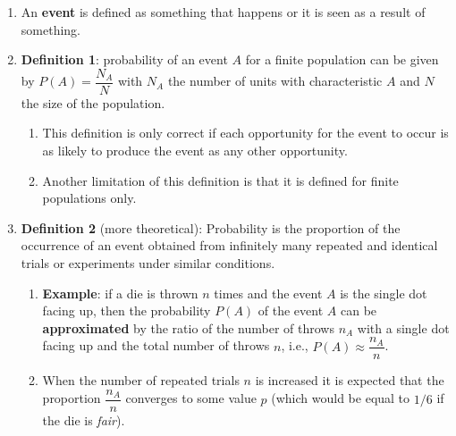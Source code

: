 \begin{enumerate}
    \item An \textbf{event} is defined as something that happens or it is seen as a result of something.
    \hfill \cite{statistics/book/Statistics-for-Data-Scientists/Maurits-Kaptein}

    \item \textbf{Definition 1}: probability of an event $A$ for a finite population can be given by $P(A) = \dfrac{N_A}{N}$ with $N_A$ the number of units with characteristic $A$ and $N$ the size of the population.
    \hfill \cite{statistics/book/Statistics-for-Data-Scientists/Maurits-Kaptein}
    \begin{enumerate}
        \item This definition is only correct if each opportunity for the event to occur is as likely to produce the event as any other opportunity.
        \hfill \cite{statistics/book/Statistics-for-Data-Scientists/Maurits-Kaptein}
        
        \item Another limitation of this definition is that it is defined for finite populations only.
        \hfill \cite{statistics/book/Statistics-for-Data-Scientists/Maurits-Kaptein}
    \end{enumerate}

    \item \textbf{Definition 2} (more theoretical): Probability is the proportion of the occurrence of an event obtained from infinitely many repeated and identical trials or experiments under similar conditions. 
    \hfill \cite{statistics/book/Statistics-for-Data-Scientists/Maurits-Kaptein}
    \begin{enumerate}
        \item \textbf{Example}: if a die is thrown $n$ times and the event $A$ is the single dot facing up, then the probability $P (A)$ of the event $A$ can be \textbf{approximated} by the ratio of the number of throws $n_A$ with a single dot facing up and the total number of throws $n$, i.e., $P(A) \approx \dfrac{n_A}{n}$.
        \hfill \cite{statistics/book/Statistics-for-Data-Scientists/Maurits-Kaptein}

        \item When the number of repeated trials $n$ is increased it is expected that the proportion $\dfrac{n_A}{n}$ converges to some value $p$ (which would be equal to $1/6$ if the die is \textit{fair}).
        \hfill \cite{statistics/book/Statistics-for-Data-Scientists/Maurits-Kaptein}


\end{enumerate}
\end{enumerate}
